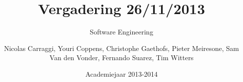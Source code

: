 \author{Nicolas Carraggi, Youri Coppens, Christophe Gaethofs, Pieter Meiresone, Sam Van den Vonder, Fernando Suarez, Tim Witters}
\title{Vergadering 26/11/2013}
\subtitle{Software Engineering} 
\date{Academiejaar 2013-2014}


\makeassignment